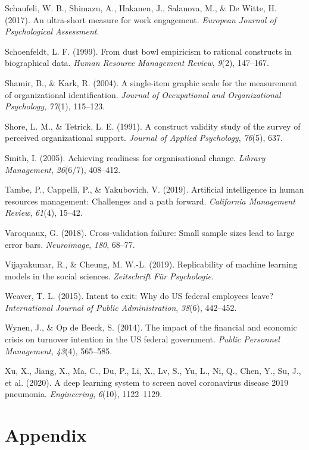\documentclass[
  man]{apa7}
\newlength{\cslhangindent}
\newlength{\cslentryspacingunit} %
\newenvironment{CSLReferences}[2] %
 {%
  \setlength{\parindent}{0pt}
  \ifodd #1
  \let\oldpar\par
  \def\par{\hangindent=\cslhangindent\oldpar}
  \fi
  \setlength{\parskip}{#2\cslentryspacingunit}
 }%
 {}
\begin{document}
\begin{CSLReferences}{1}{0}
\leavevmode{}%
Schaufeli, W. B., Shimazu, A., Hakanen, J., Salanova, M., \& De Witte, H. (2017). An ultra-short measure for work engagement. \emph{European Journal of Psychological Assessment}.

\leavevmode{}%
Schoenfeldt, L. F. (1999). From dust bowl empiricism to rational constructs in biographical data. \emph{Human Resource Management Review}, \emph{9}(2), 147--167.

\leavevmode{}%
Shamir, B., \& Kark, R. (2004). A single-item graphic scale for the measurement of organizational identification. \emph{Journal of Occupational and Organizational Psychology}, \emph{77}(1), 115--123.

\leavevmode{}%
Shore, L. M., \& Tetrick, L. E. (1991). A construct validity study of the survey of perceived organizational support. \emph{Journal of Applied Psychology}, \emph{76}(5), 637.

\leavevmode{}%
Smith, I. (2005). Achieving readiness for organisational change. \emph{Library Management}, \emph{26}(6/7), 408--412.

\leavevmode{}%
Tambe, P., Cappelli, P., \& Yakubovich, V. (2019). Artificial intelligence in human resources management: Challenges and a path forward. \emph{California Management Review}, \emph{61}(4), 15--42.

\leavevmode{}%
Varoquaux, G. (2018). Cross-validation failure: Small sample sizes lead to large error bars. \emph{Neuroimage}, \emph{180}, 68--77.

\leavevmode{}%
Vijayakumar, R., \& Cheung, M. W.-L. (2019). Replicability of machine learning models in the social sciences. \emph{Zeitschrift F{ü}r Psychologie}.

\leavevmode{}%
Weaver, T. L. (2015). Intent to exit: Why do US federal employees leave? \emph{International Journal of Public Administration}, \emph{38}(6), 442--452.

\leavevmode{}%
Wynen, J., \& Op de Beeck, S. (2014). The impact of the financial and economic crisis on turnover intention in the US federal government. \emph{Public Personnel Management}, \emph{43}(4), 565--585.

\leavevmode{}%
Xu, X., Jiang, X., Ma, C., Du, P., Li, X., Lv, S., Yu, L., Ni, Q., Chen, Y., Su, J., et al. (2020). A deep learning system to screen novel coronavirus disease 2019 pneumonia. \emph{Engineering}, \emph{6}(10), 1122--1129.

\end{CSLReferences}

\endgroup

\newpage

\hypertarget{appendix}{%
\section{Appendix}\label{appendix}}
\end{document}
